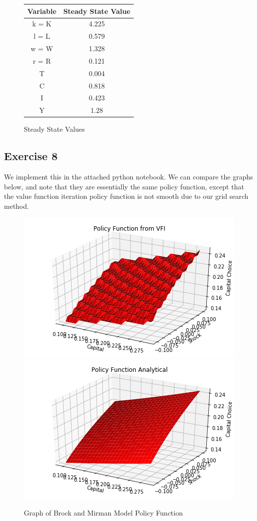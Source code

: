 \documentclass{article}
\begin{document}
	\begin{figure}[!h]
		\centering
		\caption{Steady State Values}
		\begin{tabular}{c | c}
			Variable & Steady State Value\\
			\hline
			k = K & 4.225\\
			l = L& 0.579\\
			w = W & 1.328 \\
			r = R & 0.121 \\
			T & 0.004 \\
			C & 0.818 \\
			I & 0.423 \\
			Y & 1.28  \\
			\hline
		\end{tabular}
	\end{figure}
	
	\newpage
	\subsection*{Exercise 8}
	We implement this in the attached python notebook. We can compare the graphs below, and note that they are essentially the same policy function, except that the value function iteration policy function is not smooth due to our grid search method.
	
	\begin{figure}[!h]
		\centering
		\caption{Graph of Brock and Mirman Model Policy Function}
		\includegraphics[scale = 0.5]{fig1}
		\includegraphics[scale = 0.5]{fig2}
	\end{figure}
	
\end{document}
